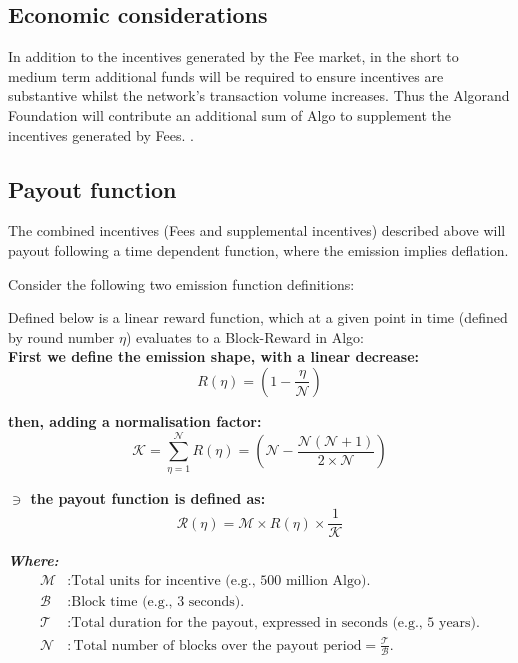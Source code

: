 \documentclass[11pt,a4paper]{article}
\begin{document}
\subsection{Economic considerations} \label{subsec:eco}
In addition to the incentives generated by the Fee market, in the short to medium term additional funds will be required
to ensure incentives are substantive whilst the network's transaction volume increases. Thus the Algorand Foundation 
will contribute an additional sum of Algo to supplement the incentives generated by Fees.
.
\pagebreak

\subsection{Payout function}
The combined incentives (Fees and supplemental incentives) described above will payout following a time dependent 
function, where the emission implies deflation.

Consider the following two emission function definitions:

Defined below is a linear reward function, which at a given point in time (defined by round number $\eta$) evaluates to 
a \gls{Block-Reward} in Algo:\\

\textbf{First we define the emission shape, with a linear decrease:}
\[
R(\eta) = (1- \frac{\eta}{\mathcal{N}})
\]

\textbf{then, adding a normalisation factor:}
\[
\mathcal{K} = \sum_{\eta=1}^\mathcal{N}R(\eta)=(\mathcal{N} -  \frac{\mathcal{N}(\mathcal{N}+1)}{2\times \mathcal{N}})  
\]

\textbf{$\ni$ the payout function is defined as:}
\[
\mathcal{R}(\eta) = \mathcal{M} \times R(\eta) \times \frac{1}{\mathcal{K}}
\]

\textbf{\emph{Where:}}
\begin{align*}
    \mathcal{M} & : \text{Total units for incentive (e.g., 500 million Algo).} \\
    \mathcal{B} & : \text{Block time (e.g., 3 seconds).} \\
    \mathcal{T} & : \text{Total duration for the payout, expressed in seconds (e.g., 5 years).} \\
    \mathcal{N} & : \text{Total number of blocks over the payout period} = \frac{\mathcal{T}}{\mathcal{B}}.\\
\end{align*}
\end{document}
